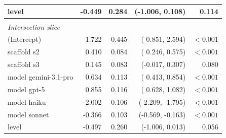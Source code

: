 \documentclass[10pt]{article} %
\begin{document}
\begin{table}[h]
\begin{center}
\begin{tabular}{lrrrr}
        level                & -0.449 & 0.284 & (-1.006,  0.108) & 0.114 \\
        \hline \\
        \multicolumn{5}{l}{\textit{Intersection slice}} \\
        (Intercept)          &  1.722 & 0.445 & ( 0.851,  2.594) & $<0.001$ \\
        scaffold s2          &  0.410 & 0.084 & ( 0.246,  0.575) & $<0.001$ \\
        scaffold s3          &  0.145 & 0.083 & (-0.017,  0.307) & 0.080 \\
        model gemini-3.1-pro &  0.634 & 0.113 & ( 0.413,  0.854) & $<0.001$ \\
        model gpt-5          &  0.855 & 0.116 & ( 0.628,  1.082) & $<0.001$ \\
        model haiku          & -2.002 & 0.106 & (-2.209, -1.795) & $<0.001$ \\
        model sonnet         & -0.366 & 0.103 & (-0.569, -0.163) & $<0.001$ \\
        level                & -0.497 & 0.260 & (-1.006,  0.013) & 0.056 \\
    \end{tabular}
    \end{center}
    \end{table}
\end{document}
